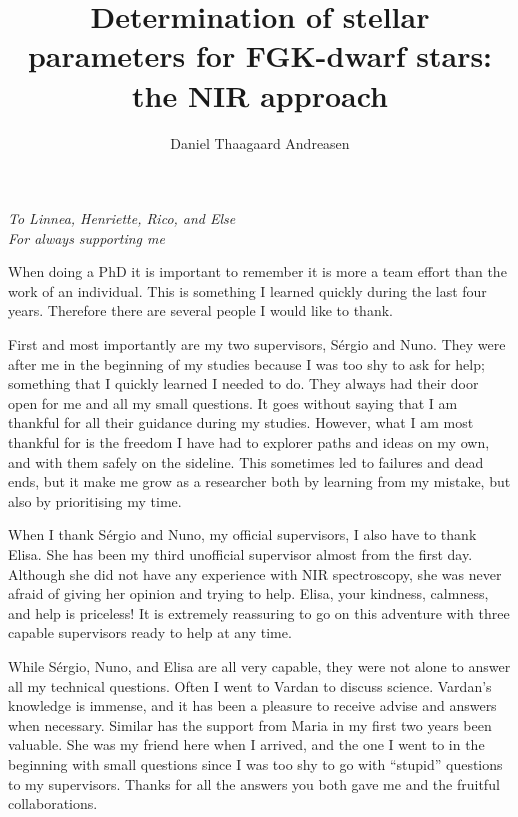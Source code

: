 \documentclass[fleqn]{fcup-thesis}
\author{Daniel Thaagaard Andreasen}
\title{Determination of stellar parameters for FGK-dwarf stars: the NIR approach}
\begin{document}
\begin{preliminary}

\maketitle
\cleardoublepage


\begin{dedication}
\centering \huge \itshape
To Linnea, Henriette, Rico, and Else\\For always supporting me
\end{dedication}


\begin{acknowledgements}

When doing a PhD it is important to remember it is more a team effort than the work of an
individual. This is something I learned quickly during the last four years. Therefore there are
several people I would like to thank.

First and most importantly are my two supervisors, Sérgio and Nuno. They were after me in the
beginning of my studies because I was too shy to ask for help; something that I quickly learned I
needed to do. They always had their door open for me and all my small questions. It goes without
saying that I am thankful for all their guidance during my studies. However, what I am most thankful
for is the freedom I have had to explorer paths and ideas on my own, and with them safely on the
sideline. This sometimes led to failures and dead ends, but it make me grow as a researcher both by
learning from my mistake, but also by prioritising my time.

When I thank Sérgio and Nuno, my official supervisors, I also have to thank Elisa. She has been my
third unofficial supervisor almost from the first day. Although she did not have any experience with
NIR spectroscopy, she was never afraid of giving her opinion and trying to help. Elisa, your
kindness, calmness, and help is priceless! It is extremely reassuring to go on this adventure with
three capable supervisors ready to help at any time.

While Sérgio, Nuno, and Elisa are all very capable, they were not alone to answer all my technical
questions. Often I went to Vardan to discuss science. Vardan's knowledge is immense, and it has been
a pleasure to receive advise and answers when necessary. Similar has the support from Maria in my
first two years been valuable. She was my friend here when I arrived, and the one I went to in the
beginning with small questions since I was too shy to go with ``stupid'' questions to my
supervisors. Thanks for all the answers you both gave me and the fruitful collaborations.


\end{acknowledgements}
\end{preliminary}
\end{document}
